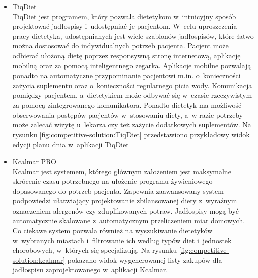 \begin{itemize}
    \item TiqDiet\\
        TiqDiet\cite{url:TiqDiet} jest programem, który pozwala dietetykom w~intuicyjny sposób projektować jadłospisy i~udostępniać je pacjentom.
        W~celu uproszczenia pracy dietetyka, udostępnianych jest wiele szablonów jadłospisów, które łatwo można dostosować do indywidualnych potrzeb pacjenta.
        Pacjent może odbierać ułożoną dietę poprzez responsywną stronę internetową, aplikację mobilną oraz za pomocą inteligentnego zegarka.
        Aplikacje mobilne pozwalają ponadto na automatyczne przypominanie pacjentowi m.in. o~konieczności zażycia suplementu oraz o~konieczności regularnego picia wody.
        Komunikacja pomiędzy pacjentem, a~dietetykiem może odbywać się w~czasie rzeczywistym za pomocą zintegrowanego komunikatora.
        Ponadto dietetyk ma możliwość obserwowania postępów pacjentów w~stosowaniu diety, a~w razie potrzeby może zalecać wizytę u~lekarza czy też zażycie dodatkowych suplementów.
        Na rysunku \ref{fig:competitive-solution:TiqDiet} przedstawiono przykładowy widok edycji planu dnia w~aplikacji TiqDiet


    \item Kcalmar PRO\\
        Kcalmar\cite{url:kcalmar} jest systemem, którego głównym założeniem jest maksymalne skrócenie czasu potrzebnego na ułożenie programu żywieniowego dopasowanego do potrzeb pacjenta.
        Zapewnia zaawansowany system podpowiedzi ułatwiający projektowanie zbilansowanej diety z~wyraźnym oznaczeniem alergenów czy zduplikowanych potraw.
        Jadłospisy mogą być automatycznie skalowane z~automatycznym przeliczeniem miar domowych.
        Co ciekawe system pozwala również na wyszukiwanie dietetyków w~wybranych miastach i~filtrowanie ich według typów diet i~jednostek chorobowych, w~których się specjalizują.
        Na rysunku \ref{fig:competitive-solution:kcalmar} pokazano widok wygenerowanej listy zakupów dla jadłospisu zaprojektowanego w~aplikacji Kcalmar.



\end{itemize}

